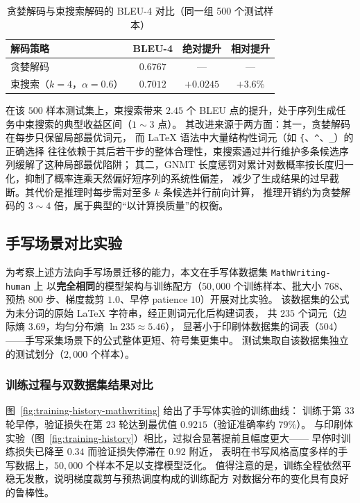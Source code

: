 \begin{table}[H]
    \centering
    \caption{贪婪解码与束搜索解码的 BLEU-4 对比（同一组 500 个测试样本）}
    \begin{tabular}{lccc}
        \toprule
        \textbf{解码策略} & \textbf{BLEU-4} & \textbf{绝对提升} & \textbf{相对提升} \\
        \midrule
        贪婪解码 & $0.6767$ & — & — \\
        束搜索（$k=4$，$\alpha=0.6$） & $\mathbf{0.7012}$ & $+0.0245$ & $+3.6\%$ \\
        \bottomrule
    \end{tabular}
    \label{tab:decoding}
\end{table}

在该 $500$ 样本测试集上，束搜索带来 $2.45$ 个 BLEU 点的提升，处于序列生成任务中束搜索的典型收益区间（$1\sim3$ 点）。
其改进来源于两方面：其一，贪婪解码在每步只保留局部最优词元，
而 LaTeX 语法中大量结构性词元（如 \texttt{\{}、\texttt{\textasciicircum}、\texttt{\_}）的正确选择
往往依赖于其后若干步的整体合理性，束搜索通过并行维护多条候选序列缓解了这种局部最优陷阱；
其二，GNMT 长度惩罚对累计对数概率按长度归一化，抑制了概率连乘天然偏好短序列的系统性偏差，
减少了生成结果的过早截断。其代价是推理时每步需对至多 $k$ 条候选并行前向计算，
推理开销约为贪婪解码的 $3 \sim 4$ 倍，属于典型的“以计算换质量”的权衡。

\subsection{手写场景对比实验}
\label{subsec:handwriting}
为考察上述方法向手写场景迁移的能力，本文在手写体数据集 \texttt{MathWriting-human} 上
以\textbf{完全相同}的模型架构与训练配方（$50{,}000$ 个训练样本、批大小 $768$、
预热 $800$ 步、梯度裁剪 $1.0$、早停 patience $10$）开展对比实验。
该数据集的公式为未分词的原始 LaTeX 字符串，经正则词元化后构建词表，
共 $235$ 个词元（边际熵 $3.69$，均匀分布熵 $\ln 235 \approx 5.46$），
显著小于印刷体数据集的词表（$504$）——手写采集场景下的公式整体更短、符号集更集中。
测试集取自该数据集独立的测试划分（$2{,}000$ 个样本）。

\subsubsection{训练过程与双数据集结果对比}
图~\ref{fig:training-history-mathwriting} 给出了手写体实验的训练曲线：
训练于第 $33$ 轮早停，验证损失在第 $23$ 轮达到最优值 $0.9215$（验证准确率约 $79\%$）。
与印刷体实验（图~\ref{fig:training-history}）相比，过拟合显著提前且幅度更大——
早停时训练损失已降至 $0.34$ 而验证损失停滞在 $0.92$ 附近，
表明在书写风格高度多样的手写数据上，$50{,}000$ 个样本不足以支撑模型泛化。
值得注意的是，训练全程依然平稳无发散，说明梯度裁剪与预热调度构成的训练配方
对数据分布的变化具有良好的鲁棒性。


